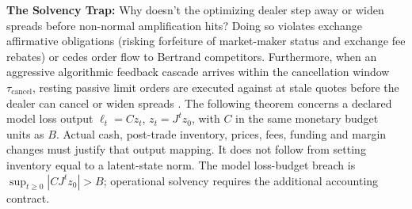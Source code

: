 \documentclass[12pt]{article}
\theoremstyle{definition}
\theoremstyle{remark}
\begin{document}
\textbf{The Solvency Trap:} Why doesn't the optimizing dealer step away or widen spreads before non-normal amplification hits? Doing so violates exchange affirmative obligations (risking forfeiture of market-maker status and exchange fee rebates) or cedes order flow to Bertrand competitors. Furthermore, when an aggressive algorithmic feedback cascade arrives within the cancellation window $\tau_{\text{cancel}}$, resting passive limit orders are executed against at stale quotes before the dealer can cancel or widen spreads \citep{budish2015}. The following theorem concerns a declared model loss output $\ell_t=Cz_t$, $z_t=J^tz_0$, with $C$ in the same monetary budget units as $B$. Actual cash, post-trade inventory, prices, fees, funding and margin changes must justify that output mapping. It does not follow from setting inventory equal to a latent-state norm. The model loss-budget breach is $\sup_{t\ge0}|CJ^tz_0|>B$; operational solvency requires the additional accounting contract.
\end{document}
